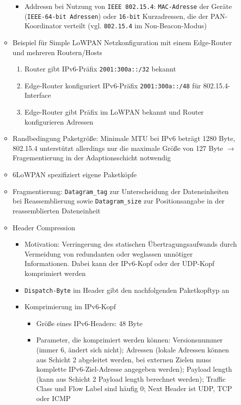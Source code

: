 \begin{itemize}
\begin{itemize}
\begin{itemize}
\begin{itemize}
			\end{itemize}
			\item Addressn bei Nutzung von \texttt{IEEE 802.15.4}: \texttt{MAC-Adresse} der Geräte (\texttt{IEEE-64-bit Adressen}) oder \texttt{16-bit} Kurzadressen, die der PAN-Koordinator verteilt (vgl. \texttt{802.15.4} im Non-Beacon-Modus)
		\end{itemize}
		\item Beispiel für Simple LoWPAN Netzkonfiguration mit einem Edge-Router und mehreren Routern/Hosts
		\begin{enumerate}
			\item Router gibt IPv6-Präfix \texttt{2001:300a::/32} bekannt
			\item Edge-Router konfiguriert IPv6-Präfix \texttt{2001:300a::/48} für 802.15.4-Interface
			\item Edge-Router gibt Präfix im LoWPAN bekannt und Router konfigurieren Adressen
		\end{enumerate}
		\item Randbedingung Paketgröße: Minimale MTU bei IPv6 beträgt 1280 Byte, 802.15.4 unterstützt allerdings nur die maximale Größe von 127 Byte \(\rightarrow\) Fragementierung in der Adaptionsschicht notwendig
		\item 6LoWPAN spezifiziert eigene Paketköpfe
		\item Fragmentierung: \texttt{Datagram\_tag} zur Unterscheidung der Dateneinheiten bei Reassemblierung sowie \texttt{Datagram\_size} zur Positionsangabe in der reassemblierten Dateneinheit
		\item Header Compression
		\begin{itemize}
			\item Motivation: Verringerung des statischen Übertragungsaufwands durch Vermeidung von redundanten oder weglassen unnötiger Informationen. Dabei kann der IPv6-Kopf oder der UDP-Kopf komprimiert werden
			\item \texttt{Dispatch-Byte} im Header gibt den nachfolgenden Paketkopftyp an
			\item Komprimierung im IPv6-Kopf
			\begin{itemize}
				\item Größe eines IPv6-Headers: 48 Byte
				\item Parameter, die komprimiert werden können: Versionsnummer (immer \(6\), ändert sich nicht); Adressen (lokale Adressen können aus Schicht 2 abgeleitet werden, bei externen Zielen muss komplette IPv6-Ziel-Adresse angegeben werden); Payload length (kann aus Schicht 2 Payload length berechnet werden); Traffic Class und Flow Label sind häufig \(0\); Next Header ist UDP, TCP oder ICMP

\end{itemize}
\end{itemize}
\end{itemize}
\end{itemize}
